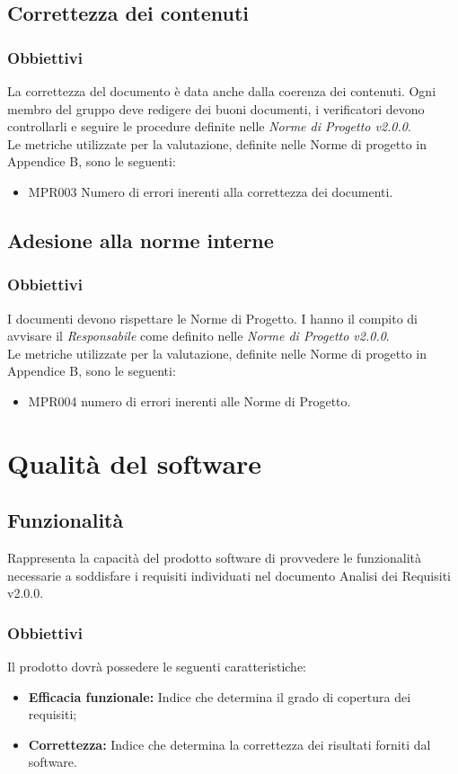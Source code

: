 \subsection{Correttezza dei contenuti}
\subsubsection{Obbiettivi}
La correttezza del documento è data anche dalla coerenza dei contenuti. Ogni membro del gruppo deve redigere dei buoni documenti, i verificatori devono controllarli e seguire le procedure definite nelle \textit{Norme di Progetto v2.0.0}.\\
Le metriche utilizzate per la valutazione, definite nelle Norme di progetto in Appendice B, sono le seguenti:
\begin{itemize}
    \item MPR003 Numero di errori inerenti alla correttezza dei documenti.
\end{itemize}
\subsection{Adesione alla norme interne}
\subsubsection{Obbiettivi}
I documenti devono rispettare le Norme di Progetto. I  hanno il compito di avvisare il \textit{Responsabile} come definito nelle \textit{Norme di Progetto v2.0.0}.\\
Le metriche utilizzate per la valutazione, definite nelle Norme di progetto in Appendice B, sono le seguenti:
\begin{itemize}
    \item MPR004 numero di errori inerenti alle Norme di Progetto.
\end{itemize}

\section{Qualità del software}
\label{software}

\subsection{Funzionalità}
Rappresenta la capacità del prodotto software di provvedere le funzionalità necessarie a soddisfare i requisiti individuati nel documento Analisi dei Requisiti v2.0.0. 
\subsubsection{Obbiettivi }Il prodotto dovrà possedere le seguenti caratteristiche:
\begin{itemize}
	\item \textbf{Efficacia funzionale:} Indice che determina il grado di copertura dei requisiti;
	\item \textbf{Correttezza:} Indice che determina la correttezza dei risultati forniti dal software.
\end{itemize}

